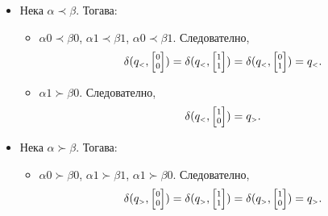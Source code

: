 \begin{extra2}
\begin{hint}
\begin{itemize}
\begin{itemize}
      $\alpha 0 \prec \beta 1$. Следователно,
      \[\delta(q_{\scriptscriptstyle{=}},\scriptsize{\begin{bmatrix} 0\\1\end{bmatrix}}) = q_{\scriptscriptstyle{>}}.\]
    \item
      $\alpha 1 \succ \beta 0$. Следователно,
      \[\delta(q_{\scriptscriptstyle{=}},\scriptsize{\begin{bmatrix} 1\\0\end{bmatrix}}) = q_{\scriptscriptstyle{<}}.\]
    \end{itemize}
  \item 
    Нека $\alpha \prec \beta$. Тогава:
    \begin{itemize}
    \item 
      $\alpha 0 \prec \beta 0$, $\alpha 1 \prec \beta 1$, $\alpha 0 \prec \beta 1$. Следователно,
      \[\delta(q_{\scriptscriptstyle{<}},\scriptsize{\begin{bmatrix} 0\\0\end{bmatrix}}) = \delta(q_{\scriptscriptstyle{<}},\scriptsize{\begin{bmatrix} 1\\1\end{bmatrix}}) = \delta(q_{\scriptscriptstyle{<}},\scriptsize{\begin{bmatrix} 0\\1\end{bmatrix}}) = q_{\scriptscriptstyle{<}}.\]
    \item
      $\alpha 1 \succ \beta 0$. Следователно,
      \[\delta(q_{\scriptscriptstyle{<}},\scriptsize{\begin{bmatrix} 1\\0\end{bmatrix}}) = q_{\scriptscriptstyle{>}}.\]
    \end{itemize}
  \item
    Нека $\alpha \succ \beta$. Тогава:
    \begin{itemize}
    \item 
      $\alpha 0 \succ \beta 0$, $\alpha 1 \succ \beta 1$, $\alpha 1 \succ \beta 0$. Следователно,
      \[\delta(q_{\scriptscriptstyle{>}},\scriptsize{\begin{bmatrix} 0\\0\end{bmatrix}}) = \delta(q_{\scriptscriptstyle{>}},\scriptsize{\begin{bmatrix} 1\\1\end{bmatrix}}) = \delta(q_{\scriptscriptstyle{>}},\scriptsize{\begin{bmatrix} 1\\0\end{bmatrix}}) = q_{\scriptscriptstyle{>}}.\]

\end{itemize}
\end{itemize}
\end{hint}
\end{extra2}
